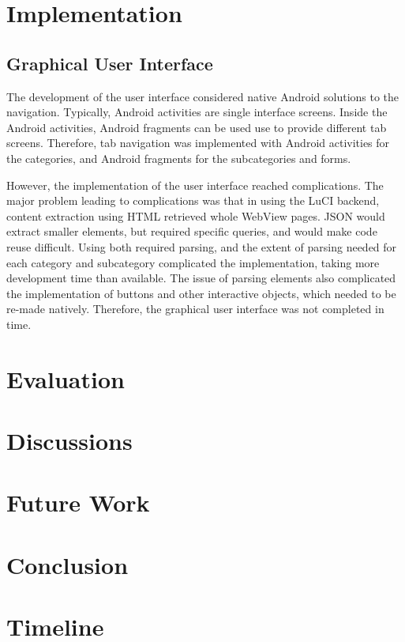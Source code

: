 \documentclass{sig-alternate-05-2015}
\begin{document}
	\section{Implementation}
	\subsection{Graphical User Interface}
	The development of the user interface considered native Android solutions to the navigation. Typically, Android activities are single interface screens. Inside the Android activities, Android fragments can be used use to provide different tab screens. Therefore, tab navigation was implemented with Android activities for the categories, and Android fragments for the subcategories and forms.
	
	However, the implementation of the user interface reached complications. The major problem leading to complications was that in using the LuCI backend, content extraction using HTML retrieved whole WebView pages. JSON would extract smaller elements, but required specific queries, and would make code reuse difficult. Using both required parsing, and the extent of parsing needed for each category and subcategory complicated the implementation, taking more development time than available. The issue of parsing elements also complicated the implementation of buttons and other interactive objects, which needed to be re-made natively. Therefore, the graphical user interface was not completed in time.
	
	\section{Evaluation}
	
	\section{Discussions}
	
	\section{Future Work}
	
	\section{Conclusion}
	
	\section{Timeline}
	
\end{document}
